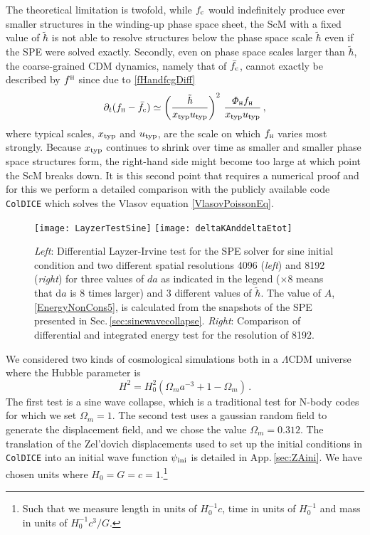 \documentclass[twocolumn, nofootinbib, showpacs, superscriptaddress]{revtex4-1}
\renewcommand{\H}[0]{{\textsc{h}}}
\newcommand{\thbar}{\tilde\hbar}
\renewcommand{\c}[0]{{\rm{c}}}
\begin{document}
The theoretical limitation is twofold, while $f_\c$ would indefinitely produce ever smaller structures in the winding-up phase space sheet, the ScM with a fixed value of $\thbar$ is not able to resolve structures below the phase space scale $\thbar$ even if the SPE were solved exactly.
Secondly, even on phase space scales larger than $\thbar$, the coarse-grained CDM dynamics, namely that of $\bar f_\c$, cannot exactly be described by $f^\H$ since due to \eqref{fHandfcgDiff} $$\partial_t(f_\H - \bar f_\c) \simeq  \left( \frac{\thbar}{x_{\rm typ} u_{\rm typ}} \right)^2\, \frac{\varPhi_\H f_\H}{x_{\rm typ} u_{\rm typ}}\,, $$
where typical scales, $x_{\rm typ}$ and $u_{\rm typ}$, are the scale on which $f_\H$ varies most strongly.
 Because $x_{\rm typ}$ continues to shrink over time as smaller and smaller phase space structures form, the right-hand side might become too large 
at which point the ScM breaks down.  It is this second point that requires a numerical proof and for this we perform a 
detailed comparison with the publicly available code \texttt{ColDICE} which solves the  Vlasov equation \eqref{VlasovPoissonEq}.
\begin{figure*}[t]
    \centering
    \texttt{[image: LayzerTestSine]}
    \texttt{[image: deltaKAnddeltaEtot]}
    \caption{{\it Left}: Differential Layzer-Irvine test for the SPE solver for sine initial condition and two different spatial resolutions 4096 ({\it left}) and 8192 ({\it right}) for three values of $da$ as indicated in the legend ($\times 8$ means that d$a$ is 8 times larger) and 3 different values of $\thbar$. The value of $A$, \eqref{EnergyNonCons5}, is calculated from the snapshots of the SPE presented in Sec.\,\ref{sec:sinewavecollapse}. {\it Right}: Comparison of differential and integrated energy test for the resolution of 8192.}
    \label{fig:EnergyCons}
\end{figure*} 

We considered two kinds of cosmological simulations both in a $\Lambda$CDM universe where the Hubble parameter is 
\begin{equation}\label{HubbleLCDM}
H^2 = H_0^2 \left( \Omega_m a^{-3}+ 1-\Omega_m \right)\,.
\end{equation}
  The first test is a sine wave collapse, which is a traditional test for N-body codes \cite{KS83} for which we set  $\Omega_m=1$. 
  The second test uses a gaussian random field to generate the displacement field, and we chose the value $\Omega_m=0.312$.
  The translation of the Zel'dovich displacements used to set up the initial conditions in \texttt{ColDICE} into an initial wave function $\psi_{\rm ini}$ is detailed in App.\,\ref{sec:ZAini}.
We have chosen units where $H_0=G=c=1$.\footnote{Such that 
we measure length in units of $H_0^{-1}c$, time in units of $H_0^{-1}$ and mass in units of $H_0^{-1}c^3/G$.}
\end{document}

